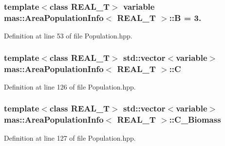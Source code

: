 \hypertarget{structmas_1_1_area_population_info_a82cc0a8d9e86bd5b6e6152b66601ad88}{
\subsubsection[{B}]{\setlength{\rightskip}{0pt plus 5cm}template$<$class R\-E\-A\-L\-\_\-\-T$>$ {\bf variable} {\bf mas\-::\-Area\-Population\-Info}$<$ R\-E\-A\-L\-\_\-\-T $>$\-::B = 3.}}\label{structmas_1_1_area_population_info_a82cc0a8d9e86bd5b6e6152b66601ad88}


Definition at line 53 of file Population.\-hpp.

\hypertarget{structmas_1_1_area_population_info_a864fe1c9aabb8e902c54b8947e4d2d06}{
\subsubsection[{C}]{\setlength{\rightskip}{0pt plus 5cm}template$<$class R\-E\-A\-L\-\_\-\-T$>$ std\-::vector$<${\bf variable}$>$ {\bf mas\-::\-Area\-Population\-Info}$<$ R\-E\-A\-L\-\_\-\-T $>$\-::C}}\label{structmas_1_1_area_population_info_a864fe1c9aabb8e902c54b8947e4d2d06}


Definition at line 126 of file Population.\-hpp.

\hypertarget{structmas_1_1_area_population_info_aaee654771bcfe566f6705a5bbffea906}{
\subsubsection[{C\-\_\-\-Biomass}]{\setlength{\rightskip}{0pt plus 5cm}template$<$class R\-E\-A\-L\-\_\-\-T$>$ std\-::vector$<${\bf variable}$>$ {\bf mas\-::\-Area\-Population\-Info}$<$ R\-E\-A\-L\-\_\-\-T $>$\-::C\-\_\-\-Biomass}}\label{structmas_1_1_area_population_info_aaee654771bcfe566f6705a5bbffea906}


Definition at line 127 of file Population.\-hpp.

